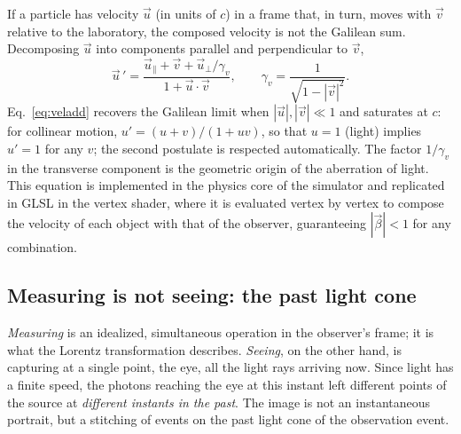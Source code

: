 \documentclass[10pt,a4paper,twocolumn]{article}
\begin{document}
If a particle has velocity $\vec{u}$ (in units of $c$) in a frame that, in turn, moves
with $\vec{v}$ relative to the laboratory, the composed velocity is not the Galilean sum.
Decomposing $\vec{u}$ into components parallel and perpendicular to $\vec{v}$,
\begin{equation}
  \vec{u}\,' =
  \frac{\vec{u}_{\parallel} + \vec{v} + \vec{u}_{\perp}/\gamma_{v}}
       {1 + \vec{u}\cdot\vec{v}},
  \qquad
  \gamma_{v} = \frac{1}{\sqrt{1-|\vec{v}|^{2}}}.
  \label{eq:veladd}
\end{equation}
Eq.~\eqref{eq:veladd} recovers the Galilean limit when $|\vec{u}|, |\vec{v}| \ll 1$ and
saturates at $c$: for collinear motion, $u' = (u+v)/(1+uv)$, so that $u = 1$ (light)
implies $u' = 1$ for any $v$; the second postulate is respected automatically. The factor
$1/\gamma_{v}$ in the transverse component is the geometric origin of the aberration of
light. This equation is implemented in the physics core of the simulator and replicated
in GLSL in the vertex shader, where it is evaluated vertex by vertex to compose the
velocity of each object with that of the observer, guaranteeing $|\vec{\beta}| < 1$ for
any combination.

\subsection{Measuring is not seeing: the past light cone}
\label{sec:conedeluz}

\emph{Measuring} is an idealized, simultaneous operation in the observer's frame; it is
what the Lorentz transformation describes. \emph{Seeing}, on the other hand, is capturing
at a single point, the eye, all the light rays arriving now. Since light has a finite
speed, the photons reaching the eye at this instant left different points of the source
at \emph{different instants in the past}. The image is not an instantaneous portrait, but
a stitching of events on the past light cone of the observation event.
\end{document}
